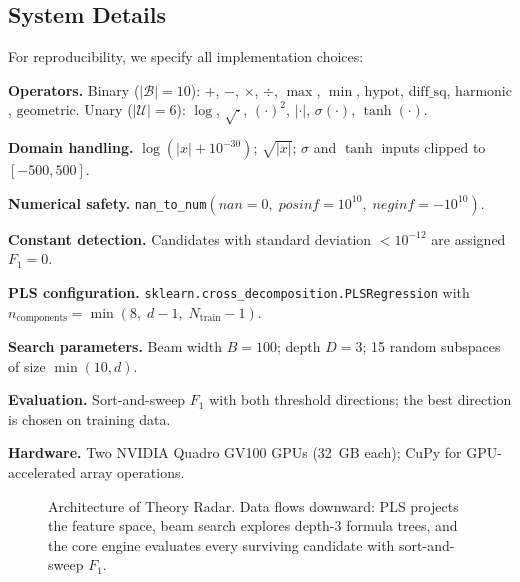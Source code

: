 \documentclass[journal]{IEEEtran}
\begin{document}
\subsection{System Details}
\label{sec:system}

For reproducibility, we specify all implementation choices:

\textbf{Operators.}
Binary ($|\mathcal{B}| = 10$): $+$, $-$, $\times$, $\div$,
$\max$, $\min$, $\mathrm{hypot}$, $\mathrm{diff\_sq}$,
$\mathrm{harmonic}$, $\mathrm{geometric}$.
Unary ($|\mathcal{U}| = 6$): $\log$, $\sqrt{\cdot}$, $(\cdot)^2$,
$|\cdot|$, $\sigma(\cdot)$, $\tanh(\cdot)$.

\textbf{Domain handling.}
$\log(|x| + 10^{-30})$; $\sqrt{|x|}$; $\sigma$ and $\tanh$ inputs
clipped to $[-500, 500]$.

\textbf{Numerical safety.}
\texttt{nan\_to\_num}$(nan{=}0,\; posinf{=}10^{10},\;
neginf{=}{-}10^{10})$.

\textbf{Constant detection.}
Candidates with standard deviation $< 10^{-12}$ are assigned
$F_1 = 0$.

\textbf{PLS configuration.}
\texttt{sklearn.cross\_decomposition.PLSRegression} with
$n_{\mathrm{components}} = \min(8,\; d{-}1,\; N_{\mathrm{train}}{-}1)$.

\textbf{Search parameters.}
Beam width $B = 100$; depth $D = 3$; 15 random subspaces of size
$\min(10, d)$.

\textbf{Evaluation.}
Sort-and-sweep $F_1$ with both threshold directions; the best
direction is chosen on training data.

\textbf{Hardware.}
Two NVIDIA Quadro GV100 GPUs (32~GB each); CuPy for GPU-accelerated
array operations.

\begin{figure}[t]
\centering
{}
\caption{Architecture of Theory Radar.  Data flows downward:
PLS projects the feature space, beam search explores depth-3
formula trees, and the core engine evaluates every surviving
candidate with sort-and-sweep $F_1$.}
\label{fig:architecture}
\end{figure}
\end{document}
